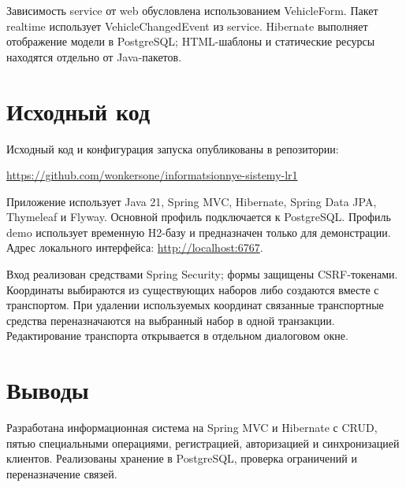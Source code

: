 \documentclass[14pt,a4paper]{extarticle}
\begin{document}
Зависимость service от web обусловлена использованием VehicleForm. Пакет realtime использует VehicleChangedEvent из service. Hibernate выполняет отображение модели в PostgreSQL; HTML-шаблоны и статические ресурсы находятся отдельно от Java-пакетов.

\clearpage
\section{Исходный код}
Исходный код и конфигурация запуска опубликованы в репозитории:
\begin{center}
\url{https://github.com/wonkersone/informatsionnye-sistemy-lr1}
\end{center}

Приложение использует Java 21, Spring MVC, Hibernate, Spring Data JPA, Thymeleaf и Flyway. Основной профиль подключается к PostgreSQL. Профиль demo использует временную H2-базу и предназначен только для демонстрации. Адрес локального интерфейса: \url{http://localhost:6767}.

Вход реализован средствами Spring Security; формы защищены CSRF-токенами. Координаты выбираются из существующих наборов либо создаются вместе с транспортом. При удалении используемых координат связанные транспортные средства переназначаются на выбранный набор в одной транзакции. Редактирование транспорта открывается в отдельном диалоговом окне.

\section{Выводы}
Разработана информационная система на Spring MVC и Hibernate с CRUD, пятью специальными операциями, регистрацией, авторизацией и синхронизацией клиентов. Реализованы хранение в PostgreSQL, проверка ограничений и переназначение связей.
\end{document}

